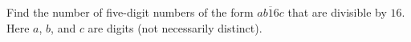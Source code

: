 Find the number of five-digit numbers of the form $\overline{ab16c}$ that are divisible by $16$. Here $a$, $b$, and $c$ are digits (not necessarily distinct).
